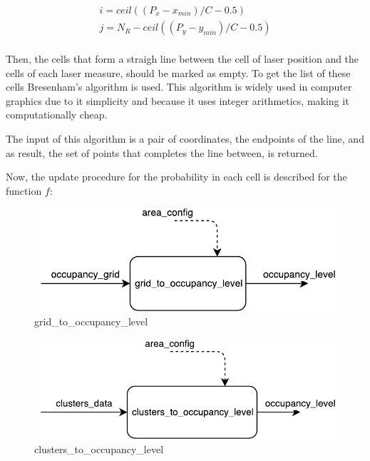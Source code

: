 \begin{description}
\begin{eqnarray*}
i = ceil((P_x - x_{min})/C - 0.5) \\
j = N_R - ceil((P_y - y_{min})/C - 0.5) \\
\end{eqnarray*}

Then, the cells that form a straigh line between the cell of laser position and the cells of each laser measure, should be marked as empty. To get the list of these cells Bresenham's algorithm  is used. This algorithm is widely used in computer graphics due to it simplicity and because it uses integer arithmetics, making it computationally cheap.

The input of this algorithm is a pair of coordinates, the endpoints of the line, and as result, the set of points that completes the line between, is returned.

Now, the update procedure for the probability in each cell is described for the function $f$:




\begin{figure}[ht!]
\centering
\includegraphics[scale=0.8]{fig/3/grid_to_occupancy_level.pdf}
\caption{grid\_to\_occupancy\_level}
\label{grid_to_occupancy_level}
\end{figure}

\begin{figure}[ht!]
\centering
\includegraphics[scale=0.8]{fig/3/clusters_to_occupancy_level.pdf}
\caption{clusters\_to\_occupancy\_level}
\label{clusters_to_occupancy_level}
\end{figure}


\end{description}
